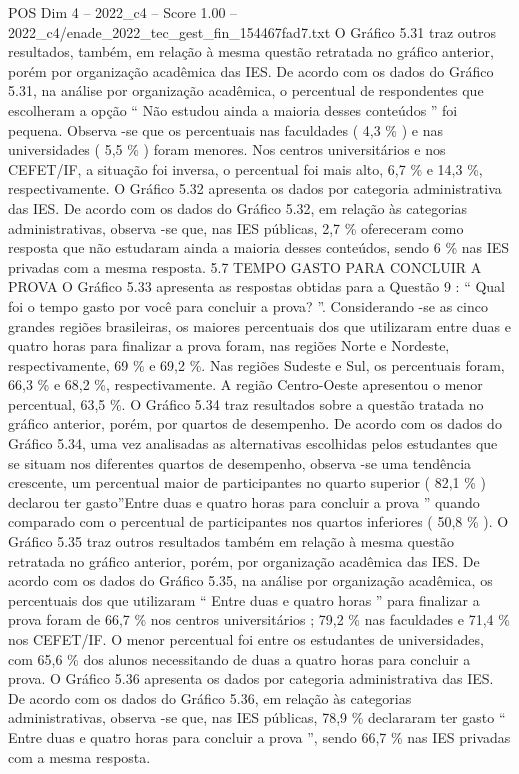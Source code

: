 \begin{textsample}{POS Dim 4 – 2022\_c4 – Score 1.00 – 2022\_c4/enade\_2022\_tec\_gest\_fin\_154467fad7.txt}
O Gráfico 5.31 traz outros resultados, também, em relação à mesma questão retratada no gráfico anterior, porém por organização acadêmica das IES.
De acordo com os dados do Gráfico 5.31, na análise por organização acadêmica, o percentual de respondentes que escolheram a opção “ Não estudou ainda a maioria desses conteúdos ” foi pequena.
Observa -se que os percentuais nas faculdades ( 4,3 \% ) e nas universidades ( 5,5 \% ) foram menores.
Nos centros universitários e nos CEFET/IF, a situação foi inversa, o percentual foi mais alto, 6,7 \% e 14,3 \%, respectivamente.
O Gráfico 5.32 apresenta os dados por categoria administrativa das IES.
De acordo com os dados do Gráfico 5.32, em relação às categorias administrativas, observa -se que, nas IES públicas, 2,7 \% ofereceram como resposta que não estudaram ainda a maioria desses conteúdos, sendo 6 \% nas IES privadas com a mesma resposta. 5.7 TEMPO GASTO PARA CONCLUIR A PROVA O Gráfico 5.33 apresenta as respostas obtidas para a Questão 9 : “ Qual foi o tempo gasto por você para concluir a prova? ”.
Considerando -se as cinco grandes regiões brasileiras, os maiores percentuais dos que utilizaram entre duas e quatro horas para finalizar a prova foram, nas regiões Norte e Nordeste, respectivamente, 69 \% e 69,2 \%.
Nas regiões Sudeste e Sul, os percentuais foram, 66,3 \% e 68,2 \%, respectivamente.
A região Centro-Oeste apresentou o menor percentual, 63,5 \%.
O Gráfico 5.34 traz resultados sobre a questão tratada no gráfico anterior, porém, por quartos de desempenho.
De acordo com os dados do Gráfico 5.34, uma vez analisadas as alternativas escolhidas pelos estudantes que se situam nos diferentes quartos de desempenho, observa -se uma tendência crescente, um percentual maior de participantes no quarto superior ( 82,1 \% ) declarou ter gasto”Entre duas e quatro horas para concluir a prova ” quando comparado com o percentual de participantes nos quartos inferiores ( 50,8 \% ).
O Gráfico 5.35 traz outros resultados também em relação à mesma questão retratada no gráfico anterior, porém, por organização acadêmica das IES.
De acordo com os dados do Gráfico 5.35, na análise por organização acadêmica, os percentuais dos que utilizaram “ Entre duas e quatro horas ” para finalizar a prova foram de 66,7 \% nos centros universitários ; 79,2 \% nas faculdades e 71,4 \% nos CEFET/IF.
O menor percentual foi entre os estudantes de universidades, com 65,6 \% dos alunos necessitando de duas a quatro horas para concluir a prova.
O Gráfico 5.36 apresenta os dados por categoria administrativa das IES.
De acordo com os dados do Gráfico 5.36, em relação às categorias administrativas, observa -se que, nas IES públicas, 78,9 \% declararam ter gasto “ Entre duas e quatro horas para concluir a prova ”, sendo 66,7 \% nas IES privadas com a mesma resposta.

\end{textsample}
